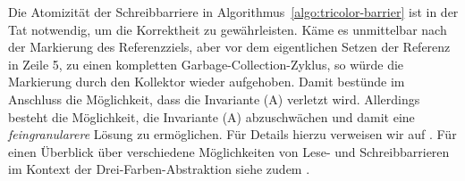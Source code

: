 Die Atomizität der Schreibbarriere  in Algorithmus~\ref{algo:tricolor-barrier} ist in der Tat notwendig, um die Korrektheit zu gewährleisten.
Käme es unmittelbar nach der Markierung des Referenzziels, aber vor dem eigentlichen Setzen der Referenz in Zeile 5, zu einen kompletten Garbage-Collection-Zyklus, so würde die Markierung durch den Kollektor wieder aufgehoben.
Damit bestünde im Anschluss die Möglichkeit, dass die Invariante (A) verletzt wird.
Allerdings besteht die Möglichkeit, die Invariante (A) abzuschwächen und damit eine \textit{feingranularere} Lösung zu ermöglichen.
Für Details hierzu verweisen wir auf \cite[S. 972ff]{dijkstra1978}.
Für einen Überblick über verschiedene Möglichkeiten von Lese- und Schreibbarrieren im Kontext der Drei-Farben-Abstraktion siehe zudem \cite{pirinen}.


